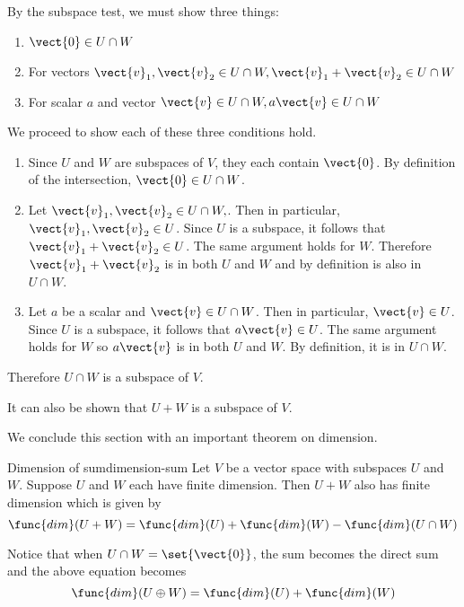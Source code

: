 \begin{solution}
By the subspace test, we must show three things:
\begin{enumerate}
\item $\vect{0} \in U \cap W$
\item For vectors $\vect{v}_1, \vect{v}_2 \in U \cap W, \vect{v}_1+\vect{v}_2 \in U \cap W$
\item For scalar $a$ and vector $\vect{v} \in U \cap W, a\vect{v} \in U \cap W$
\end{enumerate}

We proceed to show each of these three conditions hold.
\begin{enumerate}
\item 
Since $U$ and $W$ are subspaces of $V$, they each contain $\vect{0}$. By definition of the intersection, $\vect{0} \in U \cap W$. 

\item
Let  $\vect{v}_1, \vect{v}_2 \in U \cap W,$. Then in particular,  $\vect{v}_1, \vect{v}_2 \in U$. Since $U$ is a subspace, it follows that $ \vect{v}_1+\vect{v}_2 \in U$. The same argument holds for $W$. Therefore $\vect{v}_1+\vect{v}_2$ is in both $U$ and $W$ and by definition is also in $U \cap W$. 

\item 
Let $a$ be a scalar and $\vect{v} \in U \cap W$. Then in particular, $\vect{v} \in U$. Since $U$ is a subspace, it follows that $a \vect{v} \in U$. The same argument holds for $W$ so $a\vect{v}$ is in both $U$ and $W$. By definition, it is in $U \cap W$. 
\end{enumerate}

Therefore $U \cap W$ is a subspace of $V$. 
\end{solution}

It can also be shown that $U + W$ is a subspace of $V$.

We conclude this section with an important theorem on dimension.

\begin{theorem}{Dimension of sum}{dimension-sum}
Let $V$ be a vector space with subspaces $U$ and $W$. Suppose $U$ and $W$ each have finite dimension. Then $U + W$ also has finite dimension which is given by\[
\func{dim} (U+W) = \func{dim}(U) + \func{dim}(W) - \func{dim} (U \cap W)
\]
\end{theorem}

Notice that when $U \cap W = \set{\vect{0} }$, the sum becomes the direct sum and the above equation becomes 
\[
\func{dim} (U \oplus W) = \func{dim}(U) + \func{dim}(W)
\]